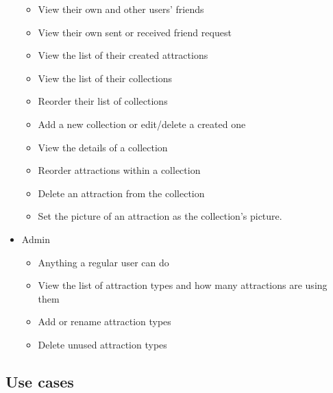 \begin{itemize}
\begin{itemize}
        \item View their own and other users' friends
        \item View their own sent or received friend request
        \item View the list of their created attractions
        \item View the list of their collections
        \item Reorder their list of collections
        \item Add a new collection or edit/delete a created one
        \item View the details of a collection
        \item Reorder attractions within a collection
        \item Delete an attraction from the collection
        \item Set the picture of an attraction as the collection's picture.
    \end{itemize}
    \item Admin
    \begin{itemize}
        \item Anything a regular user can do
        \item View the list of attraction types and how many attractions are using them
        \item Add or rename attraction types
        \item Delete unused attraction types
    \end{itemize}
\end{itemize}


\subsection{Use cases}

